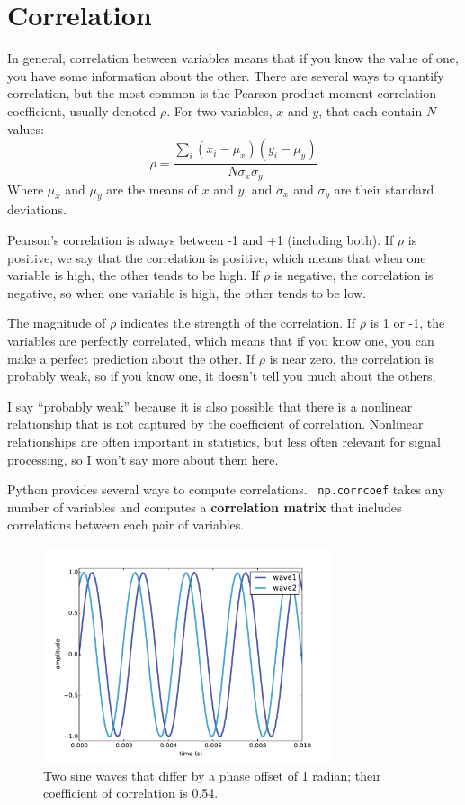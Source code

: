 \documentclass[12pt]{book}
\begin{document}
\section{Correlation}

In general, correlation between variables means that if you know the
value of one, you have some information about the other.  There are
several ways to quantify correlation, but the most common is the
Pearson product-moment correlation coefficient, usually denoted
$\rho$.  For two variables, $x$ and $y$, that each contain $N$ values:
%
\[ \rho = \frac{ \sum_i (x_i - \mu_x) (y_i - \mu_y)}{N \sigma_x \sigma_y} \]
%
Where $\mu_x$ and $\mu_y$ are the means of $x$ and $y$, and
$\sigma_x$ and $\sigma_y$ are their standard deviations.

Pearson's correlation is always between -1 and +1 (including both).
If $\rho$ is positive, we say that the correlation is positive,
which means that when one variable is high, the other tends to be
high.  If $\rho$ is negative, the correlation is negative, so
when one variable is high, the other tends to be low.

The magnitude of $\rho$ indicates the strength of the correlation.  If
$\rho$ is 1 or -1, the variables are perfectly correlated, which means
that if you know one, you can make a perfect prediction about the
other.  If $\rho$ is near zero, the correlation is probably weak, so
if you know one, it doesn't tell you much about the others,

I say ``probably weak'' because it is also possible that there is
a nonlinear relationship that is not captured by the coefficient
of correlation.  Nonlinear relationships are often important in
statistics, but less often relevant for signal processing, so I
won't say more about them here.

Python provides several ways to compute correlations.  {\tt
  np.corrcoef} takes any number of variables and computes a {\bf
  correlation matrix} that includes correlations between each pair of
variables.

\begin{figure}
\centerline{\includegraphics[height=2.5in]{figs/autocorr1.pdf}}
\caption{Two sine waves that differ by a phase offset of 1 radian;
their coefficient of correlation is 0.54.}
\label{fig.autocorr1}
\end{figure}
\end{document}
